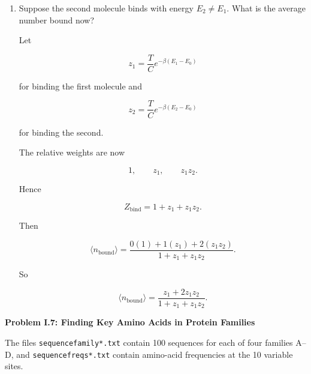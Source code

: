 \documentclass[11pt]{article}
\newcommand{\problem}[1]{%
    \vspace{1em}
    {\large\bfseries #1}
    \par
    \vspace{0.4em}
}
\begin{document}
\begin{enumerate}
The relative statistical weights for having \(0,1,2\) bound molecules are

\[
1,\qquad z,\qquad z^2.
\]

Therefore

\[
Z_{\text{bind}}
=
1+z+z^2.
\]

The average number bound is

\[
\langle n_{\mathrm{bound}}\rangle
=
\frac{
0(1)+1(z)+2(z^2)
}{
1+z+z^2
}.
\]

Thus

\[
\langle n_{\mathrm{bound}}\rangle
=
\frac{z+2z^2}{1+z+z^2}.
\]

\item Suppose the second molecule binds with energy \(E_2\neq E_1\). What
is the average number bound now?

Let

\[
z_1
=
\frac{T}{C}
e^{-\beta(E_1-E_0)}
\]

for binding the first molecule and

\[
z_2
=
\frac{T}{C}
e^{-\beta(E_2-E_0)}
\]

for binding the second.

The relative weights are now

\[
1,
\qquad
z_1,
\qquad
z_1z_2.
\]

Hence

\[
Z_{\text{bind}}
=
1+z_1+z_1z_2.
\]

Then

\[
\langle n_{\mathrm{bound}}\rangle
=
\frac{
0(1)+1(z_1)+2(z_1z_2)
}{
1+z_1+z_1z_2
}.
\]

So

\[
\langle n_{\mathrm{bound}}\rangle
=
\frac{
z_1+2z_1z_2
}{
1+z_1+z_1z_2
}.
\]

\end{enumerate}


\problem{Problem I.7: Finding Key Amino Acids in Protein Families}

The files \texttt{sequencefamily*.txt} contain 100 sequences for each of four
families A--D, and \texttt{sequencefreqs*.txt} contain amino-acid frequencies
at the 10 variable sites.
\end{document}
